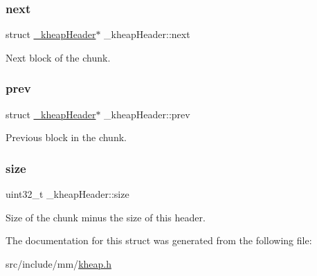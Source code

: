 \subsubsection{\texorpdfstring{next}{next}}
{\footnotesize\ttfamily struct \hyperlink{struct__kheapHeader}{\+\_\+kheap\+Header}$\ast$ \+\_\+kheap\+Header\+::next}



Next block of the chunk. 

\mbox{\label{struct__kheapHeader_a6755f9f330cfee6083f4f330af129608}} 
\subsubsection{\texorpdfstring{prev}{prev}}
{\footnotesize\ttfamily struct \hyperlink{struct__kheapHeader}{\+\_\+kheap\+Header}$\ast$ \+\_\+kheap\+Header\+::prev}



Previous block in the chunk. 

\mbox{\label{struct__kheapHeader_aee2f50280223d62d19e3941897d08d23}} 
\subsubsection{\texorpdfstring{size}{size}}
{\footnotesize\ttfamily uint32\+\_\+t \+\_\+kheap\+Header\+::size}



Size of the chunk minus the size of this header. 



The documentation for this struct was generated from the following file\+:\begin{DoxyCompactItemize}
\item 
src/include/mm/\hyperlink{kheap_8h}{kheap.\+h}\end{DoxyCompactItemize}
